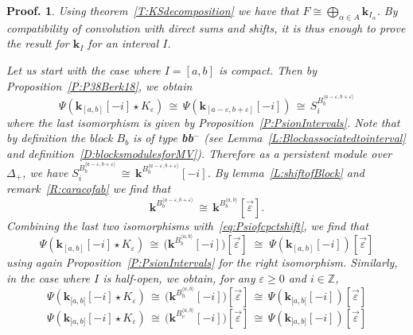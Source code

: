 \documentclass[a4paper, english, 11pt]{article}
\newcommand{\kk}[0]{\textbf{k}}
\newcommand{\0}{\vec{0}}
\newtheorem*{pf}{Proof.} }
\begin{document}
\begin{pf}
 Using theorem~\ref{T:KSdecomposition} we have that $F\cong \bigoplus_{\alpha \in A} \kk_{I_\alpha} $. By compatibility of convolution with direct sums and shifts, it is thus enough to prove the result for $\kk_I$ for an interval $I$. 
 
Let us start with the case where $I= [a,b]$ is compact.    Then by Proposition~\ref{P:P38Berk18}, we obtain 
\begin{equation}\label{eq:Psiofcpctshift}
 \Psi(\kk_{[a,b]}[-i] \star K_{\varepsilon}) \,\cong\,  \Psi(\kk_{[a-\varepsilon,b+\varepsilon]}[-i])
 \, \cong \, S_i^{B_{b}^{\langle a-\varepsilon, b +\varepsilon\rangle}}
\end{equation}
where the last isomorphism is given by Proposition~\ref{P:PsionIntervals}. Note that by definition the block $B_b$ is of type \textbf{bb}$^{-}$ (see Lemma~\ref{L:Blockassociatedtointerval} and definition~\ref{D:blocksmodulesforMV}). Therefore as a persistent module over $\Delta_+$, we have 
$S_i^{B_{b}^{\langle a-\varepsilon, b +\varepsilon\rangle}} \,\cong\, \kk^{B_{b}^{\langle a-\varepsilon, b+\varepsilon \rangle}} [-i]$. By lemma~\ref{L:shiftofBlock} and remark~\ref{R:caracofab} we find that 
$$\kk^{B_{b}^{\langle a-\varepsilon, b+\varepsilon \rangle}} \, \cong \, \kk^{B_{b}^{\langle a, b\rangle}}[\vec{\varepsilon}]. $$
Combining the last two isomorphisms with~\eqref{eq:Psiofcpctshift}, we find that 
\begin{equation}
 \Psi(\kk_{[a,b]}[-i] \star K_{\varepsilon}) \,\cong\, \Big(\kk^{B_{b}^{\langle a, b\rangle}}[-i]\Big)[\vec{\varepsilon}] \; \cong \;  \Psi(\kk_{[a,b]}[-i])[\vec{\varepsilon}]
\end{equation}
using again Proposition~\ref{P:PsionIntervals} for the right isomorphism.
Similarly, in the case where $I$ is half-open, we obtain, for any $\varepsilon\geq 0$ and $i\in \mathbb{Z}$, 
\begin{equation}
 \Psi(\kk_{[a,b[} [-i] \star K_{\varepsilon}) \,\cong \, \Big(\kk^{B_{h}^{\langle a, b\rangle}}[-i]\Big)[\vec{\varepsilon}] \, \cong\, \Psi(\kk_{[a,b[} [-i])[\vec{\varepsilon}] 
 \end{equation}
 \begin{equation}
 \Psi(\kk_{]a,b]} [-i] \star K_{\varepsilon})  \,\cong \, \Big(\kk^{B_{v}^{\langle a, b\rangle}}[-i]\Big)[\vec{\varepsilon}] \, \cong\,\Psi(\kk_{]a,b]} [-i])[\vec{\varepsilon}]
\end{equation}

\smallskip


\end{pf}
\end{document}
